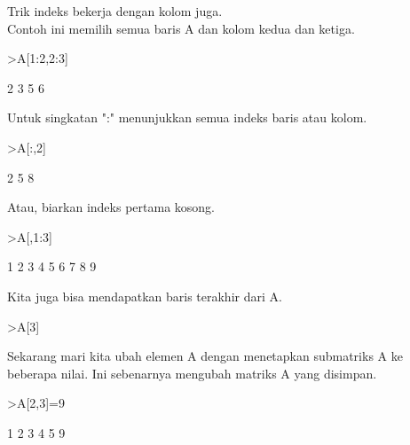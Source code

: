 \documentclass[a4paper,10pt]{article}
\begin{document}
\begin{eulernotebook}
\begin{eulercomment}
\begin{eulercomment}
\begin{eulercomment}
\begin{eulercomment}
\begin{euleroutput}
\end{euleroutput}
\begin{eulercomment}
Trik indeks bekerja dengan kolom juga.\\
Contoh ini memilih semua baris A dan kolom kedua dan ketiga.
\end{eulercomment}
\begin{eulerprompt}
>A[1:2,2:3]
\end{eulerprompt}
\begin{euleroutput}
              2             3 
              5             6 
\end{euleroutput}
\begin{eulercomment}
Untuk singkatan ":" menunjukkan semua indeks baris atau kolom.
\end{eulercomment}
\begin{eulerprompt}
>A[:,2]
\end{eulerprompt}
\begin{euleroutput}
              2 
              5 
              8 
\end{euleroutput}
\begin{eulercomment}
Atau, biarkan indeks pertama kosong.
\end{eulercomment}
\begin{eulerprompt}
>A[,1:3]
\end{eulerprompt}
\begin{euleroutput}
              1             2             3 
              4             5             6 
              7             8             9 
\end{euleroutput}
\begin{eulercomment}
Kita juga bisa mendapatkan baris terakhir dari A.
\end{eulercomment}
\begin{eulerprompt}
>A[3]
\end{eulerprompt}
\begin{euleroutput}
  [7,  8,  9]
\end{euleroutput}
\begin{eulercomment}
Sekarang mari kita ubah elemen A dengan menetapkan submatriks A ke
beberapa nilai. Ini sebenarnya mengubah matriks A yang disimpan.
\end{eulercomment}
\begin{eulerprompt}
>A[2,3]=9
\end{eulerprompt}
\begin{euleroutput}
              1             2             3 
              4             5             9 

\end{euleroutput}
\end{eulercomment}
\end{eulercomment}
\end{eulercomment}
\end{eulercomment}
\end{eulernotebook}
\end{document}
